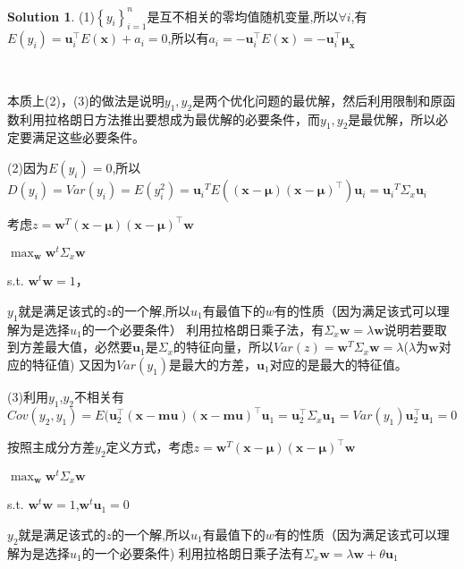\documentclass[a4paper,UTF8]{article}
\theoremstyle{definition}
\newtheorem*{solution}{Solution}
\begin{document}
\begin{solution}
	(1)$\left\{y_{i}\right\}_{i=1}^{n}$是互不相关的零均值随机变量,所以$\forall i$,有$E(y_i)=\boldsymbol{u}_{i}^{\top} E(\boldsymbol{x})+a_{i}=0$,所以有$a_{i}=-\boldsymbol{u}_{i}^{\top} E(\boldsymbol{x})=-\boldsymbol{u}_{i}^{\top}\boldsymbol{\mu}_{\boldsymbol{x}}$


	\

	本质上(2)，(3)的做法是说明$y_1,y_2$是两个优化问题的最优解，然后利用限制和原函数利用拉格朗日方法推出要想成为最优解的必要条件，而$y_1,y_2$是最优解，所以必定要满足这些必要条件。

	(2)因为$E(y_i)=0$,所以$D(y_i)=Var(y_i)=E(y_i^2)={\boldsymbol{u}_i}^TE((\boldsymbol{x}-\boldsymbol{\mu})(\boldsymbol{x}-\boldsymbol{\mu})^{\top}){\boldsymbol{u}_i}={\boldsymbol{u}_i}^T\Sigma_{x}{\boldsymbol{u}_i}$

	考虑$z={\boldsymbol{w}}^T(\boldsymbol{x}-\boldsymbol{\mu})(\boldsymbol{x}-\boldsymbol{\mu})^{\top}{\boldsymbol{w}}$

	$\max_{\boldsymbol{w}} \boldsymbol{w}^t\Sigma_{x}\boldsymbol{w} $  

	s.t. $\boldsymbol{w}^t\boldsymbol{w}=1$，

	$y_1$就是满足该式的$z$的一个解,所以$u_1$有最值下的$w$有的性质（因为满足该式可以理解为是选择$u_1$的一个必要条件） 利用拉格朗日乘子法，有$\Sigma_{x}\boldsymbol{w}=\lambda \boldsymbol{w}$说明若要取到方差最大值，必然要$\boldsymbol{u}_1$是$\Sigma_{x}$的特征向量，所以$Var(z)={\boldsymbol{w}}^T\Sigma_{x}{\boldsymbol{w}}=\lambda$($\lambda$为$\boldsymbol{w}$对应的特征值) 又因为$Var(y_1)$是最大的方差，$\boldsymbol{u}_1$对应的是最大的特征值。

	(3)利用$y_1$,$y_2$不相关有$Cov(y_2,y_1)=E(\boldsymbol{u}_2^{\top}(\boldsymbol{x}-\boldsymbol{mu})(\boldsymbol{x}-\boldsymbol{mu})^{\top}\boldsymbol{u}_1=\boldsymbol{u}_2^{\top}\Sigma_{x}\boldsymbol{u_1}=Var(y_1)\boldsymbol{u}_2^{\top}\boldsymbol{u}_1=0$

	按照主成分方差$y_2$定义方式，考虑$z={\boldsymbol{w}}^T(\boldsymbol{x}-\boldsymbol{\mu})(\boldsymbol{x}-\boldsymbol{\mu})^{\top}{\boldsymbol{w}}$

	$\max_{\boldsymbol{w}} \boldsymbol{w}^t\Sigma_{x}\boldsymbol{w} $  

	s.t. $\boldsymbol{w}^t\boldsymbol{w}=1$,$\boldsymbol{w}^t \boldsymbol{u}_1=0$

	$y_2$就是满足该式的$z$的一个解,所以$u_1$有最值下的$w$有的性质（因为满足该式可以理解为是选择$u_1$的一个必要条件) 利用拉格朗日乘子法有$\Sigma_{x}\boldsymbol{w}=\lambda \boldsymbol{w}+\theta \boldsymbol{u}_1$


\end{solution}
\end{document}

